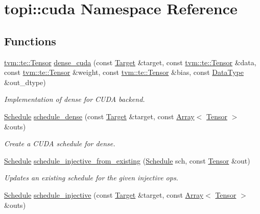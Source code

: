 \hypertarget{namespacetopi_1_1cuda}{}\section{topi\+:\+:cuda Namespace Reference}
\label{namespacetopi_1_1cuda}
\subsection*{Functions}
\begin{DoxyCompactItemize}
\item 
\hyperlink{classtvm_1_1te_1_1Tensor}{tvm\+::te\+::\+Tensor} \hyperlink{namespacetopi_1_1cuda_adf9851df7c1a1e8e847d2e13b2946d4e}{dense\+\_\+cuda} (const \hyperlink{classtvm_1_1Target}{Target} \&target, const \hyperlink{classtvm_1_1te_1_1Tensor}{tvm\+::te\+::\+Tensor} \&data, const \hyperlink{classtvm_1_1te_1_1Tensor}{tvm\+::te\+::\+Tensor} \&weight, const \hyperlink{classtvm_1_1te_1_1Tensor}{tvm\+::te\+::\+Tensor} \&bias, const \hyperlink{namespacetvm_a41918af1a1dc386388639a9d3ad06c5d}{Data\+Type} \&out\+\_\+dtype)
\begin{DoxyCompactList}\small\item\em Implementation of dense for C\+U\+DA backend. \end{DoxyCompactList}\item 
\hyperlink{classtvm_1_1te_1_1Schedule}{Schedule} \hyperlink{namespacetopi_1_1cuda_ac4a8c5cd447bc5d71956173b247b3237}{schedule\+\_\+dense} (const \hyperlink{classtvm_1_1Target}{Target} \&target, const \hyperlink{classtvm_1_1Array}{Array}$<$ \hyperlink{classtvm_1_1te_1_1Tensor}{Tensor} $>$ \&outs)
\begin{DoxyCompactList}\small\item\em Create a C\+U\+DA schedule for dense. \end{DoxyCompactList}\item 
\hyperlink{classtvm_1_1te_1_1Schedule}{Schedule} \hyperlink{namespacetopi_1_1cuda_aeb133c69956d801df6f9ff349d26ed83}{schedule\+\_\+injective\+\_\+from\+\_\+existing} (\hyperlink{classtvm_1_1te_1_1Schedule}{Schedule} sch, const \hyperlink{classtvm_1_1te_1_1Tensor}{Tensor} \&out)
\begin{DoxyCompactList}\small\item\em Updates an existing schedule for the given injective ops. \end{DoxyCompactList}\item 
\hyperlink{classtvm_1_1te_1_1Schedule}{Schedule} \hyperlink{namespacetopi_1_1cuda_a2bf9bfe82cdc71f0c74ec59e67fdeafd}{schedule\+\_\+injective} (const \hyperlink{classtvm_1_1Target}{Target} \&target, const \hyperlink{classtvm_1_1Array}{Array}$<$ \hyperlink{classtvm_1_1te_1_1Tensor}{Tensor} $>$ \&outs)

\end{DoxyCompactItemize}
